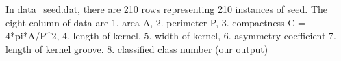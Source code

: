 In data_seed.dat, there are 210 rows representing 210 instances of seed. 
The eight column of data are 
1. area A, 
2. perimeter P, 
3. compactness C = 4*pi*A/P^2, 
4. length of kernel, 
5. width of kernel, 
6. asymmetry coefficient 
7. length of kernel groove. 
8. classified class number (our output)